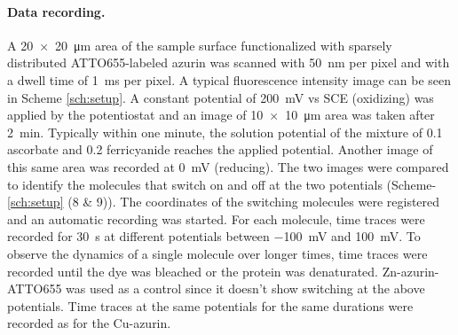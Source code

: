 \paragraph*{Data recording.}
A \SI[product-units=repeat]{20x20}{\um} area of the sample surface functionalized with sparsely distributed ATTO655-labeled azurin was scanned with \SI{50}{\nm} per pixel and with a dwell time of \SI{1}{\ms} per pixel.
A typical fluorescence intensity image can be seen in Scheme \ref{sch:setup}.
A constant potential of \SI{200}{\mV} vs SCE (oxidizing) was applied by the potentiostat and an image of \SI[product-units=repeat]{10x10}{\um} area was taken after \SI{2}{\minute}.
Typically within one minute, the solution potential of the mixture of \SI{0.1}{\mM} ascorbate and \SI{0.2}{\mM} ferricyanide reaches the applied potential.
Another image of this same area was recorded at \SI{0}{\mV} (reducing).
The two images were compared to identify the molecules that switch on and off at the two potentials (Scheme-\ref{sch:setup} (8 \& 9)).
The coordinates of the switching molecules were registered and an automatic recording was started.
For each molecule, time traces were recorded for \SI{30}{\s} at different potentials between \SI{-100}{\mV} and \SI{100}{\mV}.
To observe the dynamics of a single molecule over longer times, time traces were recorded until the dye was  bleached or the protein was denaturated.
Zn-azurin-ATTO655 was used as a control since it doesn't show switching at the above potentials.
Time traces at the same potentials for the same durations were recorded as for the Cu-azurin.

